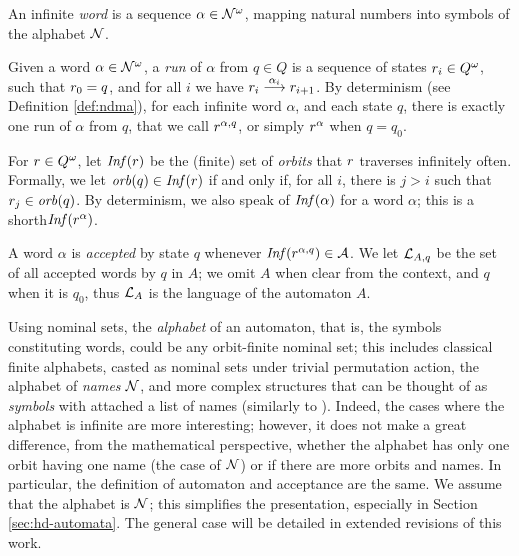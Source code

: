 \begin{definition}
 An infinite \emph{word} is a sequence $\alpha \in \mathcal{N}^\omega$, mapping natural numbers into symbols of the alphabet $\mathcal{N}$.
\end{definition}

\begin{definition}\label{def:nominal-run}
 Given a word $\alpha \in \mathcal{N}^\omega$, a \emph{run} of $\alpha$ from $q \in Q$ is a sequence of states $r_i \in Q^\omega$, such that $r_0 = q$, and for all $i$ we have $r_i \overset{\alpha_i}{\longrightarrow} r_{i+1}$. 
 By determinism (see Definition \ref{def:ndma}), for each infinite word $\alpha$, and each state $q$, there is exactly one run of $\alpha$ from $q$, that we call $r^{\alpha,q}$, or simply $r^{\alpha}$ when $q=q_0$.
\end{definition}

\begin{definition}
 For $r \in Q^\omega$, let $\mathit{Inf}(r)$ be the (finite) set of \emph{orbits} that $r$ traverses infinitely often. Formally, we let $\mathit{orb}(q) \in \mathit{Inf}(r)$ if and only if, for all $i$, there is $j > i$ such that $r_j \in \mathit{orb}(q)$. By determinism, we also speak of $\mathit{Inf}(\alpha)$ for a word $\alpha$; this is a shorth$\mathit{Inf}(r^\alpha)$.
\end{definition}

\begin{definition}
 A word $\alpha$ is \emph{accepted} by state $q$ whenever $\mathit{Inf}(r^{\alpha,q}) \in \mathcal{A}$. We let $\mathcal{L}_{A,q}$ be the set of all accepted words by $q$ in $A$; we omit $A$ when clear from the context, and $q$ when it is $q_0$, thus $\mathcal{L}_A$ is the language of the automaton $A$.
\end{definition}

\begin{remark}\label{rem:simple-alphabet} Using nominal sets, the \emph{alphabet} of an automaton, that is, the symbols constituting words, could be any orbit-finite nominal set; this includes classical finite alphabets, casted as nominal sets under trivial permutation action, the alphabet of \emph{names} $\mathcal{N}$, and more complex structures that can be thought of as \emph{symbols} with attached a list of names (similarly to \cite{MikBartekLICS}). Indeed, the cases where the alphabet is infinite are more interesting; however, it does not make a great difference, from the mathematical perspective, whether the alphabet has only one orbit having one name (the case of $\mathcal{N}$) or if there are more orbits and names. In particular, the definition of automaton and acceptance are the same. We assume that the alphabet is $\mathcal{N}$; this simplifies the presentation, especially in Section \ref{sec:hd-automata}. The general case will be detailed in extended revisions of this work.
\end{remark}

